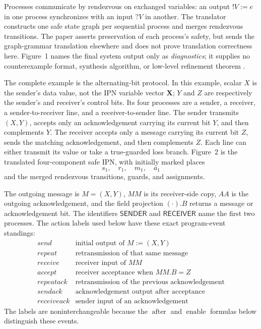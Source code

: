 Processes communicate by rendezvous on exchanged variables: an output
\(!V:=e\) in one process synchronizes with an input \(?V\) in another.
The translator constructs one safe state graph per sequential process and
merges rendezvous transitions.  The paper asserts preservation of each
process's safety, but sends the graph-grammar translation elsewhere and does
not prove translation correctness here.  Figure~1 names the final system
output only as \emph{diagnostics}; it supplies no counterexample format,
synthesis algorithm, or low-level refinement theorem
\cite[pp.~337--340]{QueilleSifakis1982}.

The complete example is the alternating-bit protocol.  In this example,
scalar \(X\) is the sender's data value, not the IPN variable vector
\(\mathbf X\); \(Y\) and \(Z\) are respectively the sender's and receiver's
control bits.  Its four processes
are a sender, a receiver, a sender-to-receiver line, and a
receiver-to-sender line.  The sender transmits \((X,Y)\), accepts only an
acknowledgement carrying its current bit \(Y\), and then complements \(Y\).
The receiver accepts only a message carrying its current bit \(Z\), sends the
matching acknowledgement, and then complements \(Z\).  Each line can either
transmit its value or take a true-guarded loss branch.  Figure~2 is the
translated four-component safe IPN, with initially marked places
\[
 s_1,\quad r_1,\quad m_1,\quad a_1
\]
and the merged rendezvous transitions, guards, and assignments.

The outgoing message is \(M=(X,Y)\), \(MM\) is its
receiver-side copy, \(AA\) is the outgoing acknowledgement, and the field
projection \((\cdot).B\) returns a message or acknowledgement bit.  The
identifiers \(\mathsf{SENDER}\) and \(\mathsf{RECEIVER}\) name the first two
processes.  The action labels used below have these exact program-event
standings:
\[
\begin{array}{c|l}
\mathit{send}&\text{initial output of }M:=(X,Y)\\
\mathit{repeat}&\text{retransmission of that same message}\\
\mathit{receive}&\text{receiver input of }MM\\
\mathit{accept}&\text{receiver acceptance when }MM.B=Z\\
\mathit{repeatack}&\text{retransmission of the previous acknowledgement}\\
\mathit{sendack}&\text{acknowledgement output after acceptance}\\
\mathit{receiveack}&\text{sender input of an acknowledgement}
\end{array}
\]
The labels are noninterchangeable because the \(\operatorname{after}\) and
\(\operatorname{enable}\) formulas below distinguish these events.

